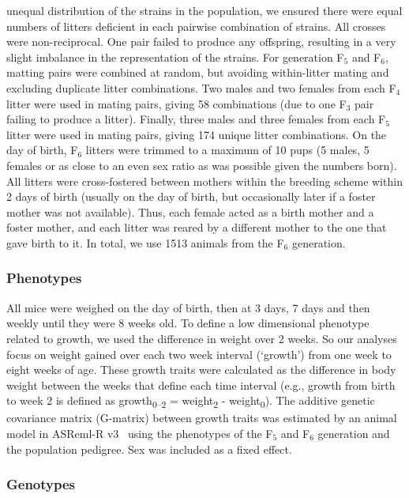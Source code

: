 \begin{refsection}
unequal distribution of the strains in the population, we ensured there were
equal numbers of litters deficient in each pairwise combination of strains.
All crosses were non-reciprocal.  One pair failed to produce any offspring,
resulting in a very slight imbalance in the representation of the strains.
For generation F$_{\text{5}}$ and F$_{\text{6}}$, matting pairs were combined
at random, but avoiding within-litter mating and excluding duplicate litter
combinations. Two males and two females from each F$_{\text{4}}$ litter were
used in mating pairs, giving 58 combinations (due to one F$_{\text{3}}$ pair
failing to produce a litter). Finally, three males and three females from each
F$_{\text{5}}$ litter were used in mating pairs, giving 174 unique litter
combinations. On the day of birth, F$_{\text{6}}$ litters were trimmed to a
maximum of 10 pups (5 males, 5 females or as close to an even sex ratio as was
possible given the numbers born).  All litters were cross-fostered between
mothers within the breeding scheme within 2 days of birth (usually on the day
of birth, but occasionally later if a foster mother was not available).  Thus,
each female acted as a birth mother and a foster mother, and each litter was
reared by a different mother to the one that gave birth to it. In total, we
use 1513 animals from the F$_{\text{6}}$ generation.

\subsubsection{Phenotypes}

All mice were weighed on the day of birth, then at 3 days, 7 days and then
weekly until they were 8 weeks old. To define a low dimensional phenotype
related to growth, we used the difference in weight over 2 weeks. So our
analyses focus on weight gained over each two week interval (`growth') from
one week to eight weeks of age. These growth traits were calculated as the
difference in body weight between the weeks that define each time interval
(e.g., growth from birth to week 2 is defined as growth\textsubscript{0--2} =
weight\textsubscript{2} - weight\textsubscript{0}). The additive genetic
covariance matrix (G-matrix) between growth traits was estimated by an animal
model in ASReml-R v3~\parencite{ASReml} using the phenotypes of the
F$_{\text{5}}$ and F$_{\text{6}}$ generation and the population pedigree. Sex
was included as a fixed effect.
  
\subsubsection{Genotypes}


\end{refsection}
